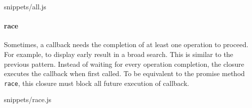              {snippets/all.js}

\paragraph{race}

Sometimes, a callback needs the completion of at least one operation to proceed.
For example, to display early result in a broad search.
This is similar to the previous pattern.
Instead of waiting for every operation completion, the closure executes the callback when first called.
To be equivalent to the promise method \texttt{race}, this closure must block all future execution of callback.

             {snippets/race.js}

